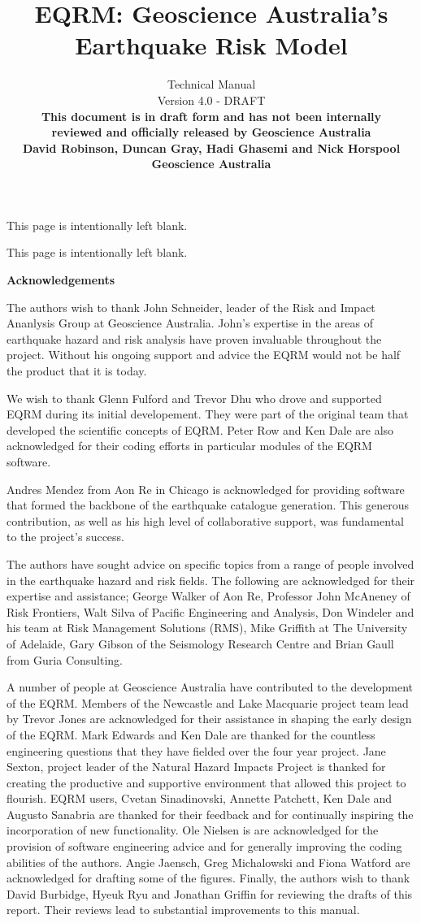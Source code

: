 \documentclass[a4paper, 12pt]{report}
\title{EQRM: Geoscience Australia's Earthquake Risk Model\\
}
\author{Technical Manual \\[1em]
Version 4.0 - DRAFT  \\[3em]
\bf{This document is in draft form and has not been internally}  \\[1em]
\bf{reviewed and officially released by Geoscience Australia} \\[3em]
David Robinson, Duncan Gray, Hadi Ghasemi and Nick Horspool\\[1em]
Geoscience Australia}
\begin{document}
\maketitle


This page is intentionally left blank. \newpage


This page is intentionally left blank.
\newpage

 {\Huge \textbf{Acknowledgements}  }

The authors wish to thank John Schneider, leader of the Risk
and Impact Ananlysis Group at Geoscience Australia. John's expertise in the
areas of earthquake hazard and risk analysis have proven
invaluable throughout the project. Without his ongoing support and
advice the EQRM would not be half the product that it is today.

We wish to thank Glenn Fulford and Trevor Dhu who drove and supported
EQRM during its initial developement.  They were part of the original
team that developed the scientific concepts of EQRM. Peter Row and Ken
Dale are also acknowledged for their coding efforts in particular
modules of the EQRM software.

Andres Mendez from Aon Re in Chicago is acknowledged for providing
software that formed the backbone of the earthquake catalogue
generation. This generous contribution, as well as his high level of
collaborative support, was fundamental to the project's success.

The authors have sought advice on specific topics from a range of
people involved in the earthquake hazard and risk fields. The
following are acknowledged for their expertise and assistance;
George Walker of Aon Re, Professor John McAneney of Risk
Frontiers, Walt Silva of Pacific Engineering and Analysis, Don
Windeler and his team at Risk Management Solutions (RMS), Mike
Griffith at The University of Adelaide, Gary Gibson of the
Seismology Research Centre and Brian Gaull from Guria Consulting.

A number of people at Geoscience Australia have contributed to the
development of the EQRM. Members of the Newcastle and Lake Macquarie
project team lead by Trevor Jones are acknowledged for their
assistance in shaping the early design of the EQRM. Mark Edwards and
Ken Dale are thanked for the countless engineering questions that they
have fielded over the four year project. Jane Sexton, project leader
of the Natural Hazard Impacts Project is thanked for creating the
productive and supportive environment that allowed this project to
flourish. EQRM users, Cvetan Sinadinovski, Annette Patchett, Ken Dale
and Augusto Sanabria are thanked for their feedback and for
continually inspiring the incorporation of new functionality. Ole
Nielsen is are acknowledged for the provision of software engineering
advice and for generally improving the coding abilities of the
authors. Angie Jaensch, Greg Michalowski and Fiona Watford are
acknowledged for drafting some of the figures.  Finally, the authors
wish to thank David Burbidge, Hyeuk Ryu and Jonathan Griffin for reviewing
the drafts of this report. Their reviews lead to substantial
improvements to this manual.
\end{document}
